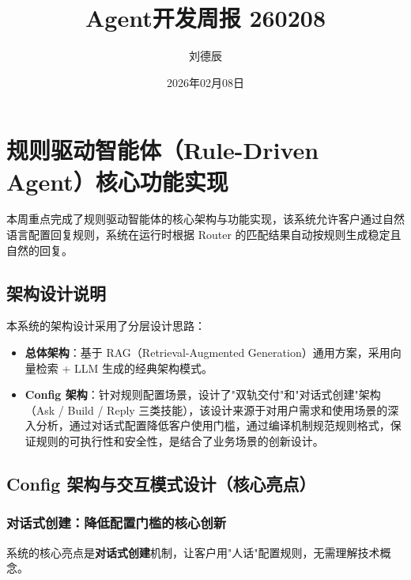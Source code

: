 \documentclass[UTF8]{ctexart}
\title{Agent开发周报 260208}
\author{刘德辰}
\date{2026年02月08日}
\begin{document}
\maketitle

\section{规则驱动智能体（Rule-Driven Agent）核心功能实现}

本周重点完成了规则驱动智能体的核心架构与功能实现，该系统允许客户通过自然语言配置回复规则，系统在运行时根据 Router 的匹配结果自动按规则生成稳定且自然的回复。

\subsection{架构设计说明}

本系统的架构设计采用了分层设计思路：
\begin{itemize}
    \item \textbf{总体架构}：基于 RAG（Retrieval-Augmented Generation）通用方案，采用向量检索 + LLM 生成的经典架构模式。
    \item \textbf{Config 架构}：针对规则配置场景，设计了"双轨交付"和"对话式创建"架构（Ask / Build / Reply 三类技能），该设计来源于对用户需求和使用场景的深入分析，通过对话式配置降低客户使用门槛，通过编译机制规范规则格式，保证规则的可执行性和安全性，是结合了业务场景的创新设计。
\end{itemize}

\subsection{Config 架构与交互模式设计（核心亮点）}

\subsubsection{对话式创建：降低配置门槛的核心创新}

系统的核心亮点是\textbf{对话式创建}机制，让客户用"人话"配置规则，无需理解技术概念。
\end{document}

